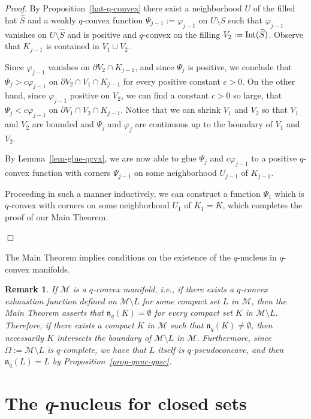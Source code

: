 \documentclass[11pt,a4paper]{article}
\newtheorem{rem}[lem]{Remark}
\newenvironment{proof}{\noindent\textit{Proof. }}{\hfill $\Box$\linebreak}
\newcommand{\Mcal}{\mathcal{M}}
\newcommand{\nuc}{\mathfrak{n}}
\newcommand{\Int}{\hbox{Int}}
\begin{document}
\begin{proof}
By Proposition~\ref{hat-q-convex} there exist a neighborhood $U$ of the filled hat $\widehat{S}$ and a weakly $q$-convex function $\Psi_{j-1}:=\varphi_{j-1}$ on $U\setminus S$ such that $\varphi_{j-1}$ vanishes on $U\setminus \widehat{S}$ and is positive and $q$-convex on the filling $V_2:=\Int(\widehat{S})$. Observe that $K_{j-1}$ is contained in $V_1 \cup V_2$. 

Since $\varphi_{j-1}$ vanishes on $\partial V_2 \cap K_{j-1}$, and since $\Psi_j$ is positive, we conclude that $\Psi_j > c\varphi_{j-1}$ on $ \partial V_2 \cap V_1 \cap K_{j-1}$ for every positive constant $c>0$. On the other hand, since $\varphi_{j-1}$ positive on $V_2$, we can find a constant $c>0$ so large, that $\Psi_j < c\varphi_{j-1}$ on $ \partial V_1 \cap V_2 \cap K_{j-1}$. Notice that we can shrink $V_1$ and $V_2$ so that $V_1$ and $V_2$ are bounded and $\Psi_j$ and $\varphi_j$ are continuous up to the boundary of $V_1$ and $V_2$. 

By Lemma~\ref{lem-glue-qcvx}, we are now able to glue $\Psi_j$ and $c\varphi_{j-1}$ to a positive $q$-convex function with corners $\Psi_{j-1}$ on some neighborhood $U_{j-1}$ of $K_{j-1}$.

Proceeding in such a manner inductively, we can construct a function $\Psi_1$ which is $q$-convex with corners on some neighborhood $U_1$ of $K_1=K$, which completes the proof of our Main Theorem.

\end{proof}

The Main Theorem implies conditions on the existence of the $q$-nucleus in $q$-convex manifolds.

\begin{rem} If $\Mcal$ is a \emph{$q$-convex manifold}, i.e., if there exists a $q$-convex exhaustion function defined on $\Mcal\setminus L$ for some compact set $L$ in $\Mcal$, then the Main Theorem asserts that $\nuc_q(K)=\emptyset$ for every compact set $K$ in $\Mcal\setminus L$. Therefore, if there exists a compact $K$ in $\Mcal$ such that $\nuc_q(K)\neq \emptyset$, then necessarily $K$ intersects the boundary of $\Mcal\setminus L$ in $\Mcal$. Furthermore, since $\Omega:=\Mcal\setminus L$ is $q$-complete, we have that $L$ itself is $q$-pseudoconcave, and then $\nuc_q(L)=L$ by Proposition~\ref{prop-qnuc-qpsc}.
\end{rem}


\section{The \textit{q}-nucleus for closed sets}
\end{document}
